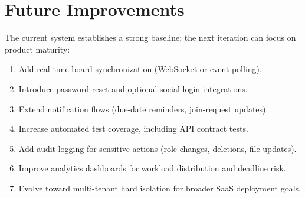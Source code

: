 \section{Future Improvements}

The current system establishes a strong baseline; the next iteration can focus on product maturity:
\begin{enumerate}
    \item Add real-time board synchronization (WebSocket or event polling).
    \item Introduce password reset and optional social login integrations.
    \item Extend notification flows (due-date reminders, join-request updates).
    \item Increase automated test coverage, including API contract tests.
    \item Add audit logging for sensitive actions (role changes, deletions, file updates).
    \item Improve analytics dashboards for workload distribution and deadline risk.
    \item Evolve toward multi-tenant hard isolation for broader SaaS deployment goals.
\end{enumerate}

